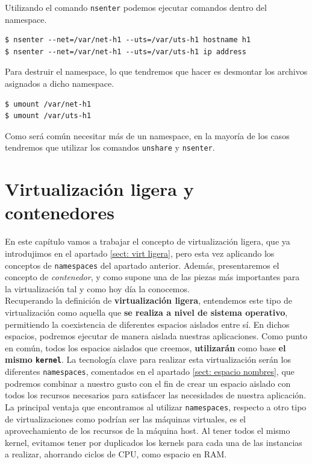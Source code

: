 \documentclass[12pt]{article}
\begin{document}
	\noindent Utilizando el comando \texttt{nsenter} podemos ejecutar comandos dentro del namespace.
	\begin{verbatim}
$ nsenter --net=/var/net-h1 --uts=/var/uts-h1 hostname h1
$ nsenter --net=/var/net-h1 --uts=/var/uts-h1 ip address
	\end{verbatim}

	\noindent Para destruir el namespace, lo que tendremos que hacer es desmontar los archivos asignados a dicho namespace.
	\begin{verbatim}
$ umount /var/net-h1
$ umount /var/uts-h1
	\end{verbatim}

	\noindent Como será común necesitar más de un namespace, en la mayoría de los casos tendremos que utilizar los comandos \texttt{unshare} y \texttt{nsenter}.

	\pagebreak
	
	\section{Virtualización ligera y contenedores}
	\label{sec: virt ligera y contenedores}
	
	\noindent En este capítulo vamos a trabajar el concepto de virtualización ligera, que ya introdujimos en el apartado \ref{sect: virt ligera}, pero esta vez aplicando los conceptos de \texttt{namespaces} del apartado anterior. Además, presentaremos el concepto de \textit{contenedor}, y como supone una de las piezas más importantes para la virtualización tal y como hoy día la conocemos. \\
	
	\noindent Recuperando la definición de \textbf{virtualización ligera}, entendemos este tipo de virtualización como aquella que \textbf{se realiza a nivel de sistema operativo}, permitiendo la coexistencia de diferentes espacios aislados entre sí. En dichos espacios, podremos ejecutar de manera aislada nuestras aplicaciones. Como punto en común, todos los espacios aislados que creemos, \textbf{utilizarán} como base \textbf{el mismo \texttt{kernel}}. La tecnología clave para realizar esta virtualización serán los diferentes \texttt{namespaces}, comentados en el apartado \ref{sect: espacio nombres}, que podremos combinar a nuestro gusto con el fin de crear un espacio aislado con todos los recursos necesarios para satisfacer las necesidades de nuestra aplicación. \\
	
	\noindent La principal ventaja que encontramos al utilizar \texttt{namespaces}, respecto a otro tipo de virtualizaciones como podrían ser las máquinas virtuales, es el aprovechamiento de los recursos de la máquina host. Al tener todos el mismo kernel, evitamos tener por duplicados los kernels para cada una de las instancias a realizar, ahorrando ciclos de CPU, como espacio en RAM.\\
	
\end{document}
